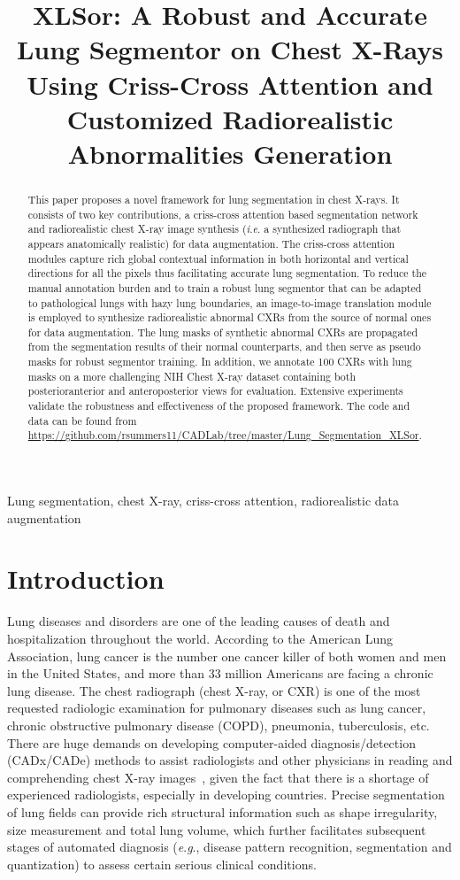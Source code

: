 \documentclass{midl} \usepackage{multirow}
\title[XLSor: A Robust and Accurate Lung Segmentor on Chest X-Rays]{XLSor: A Robust and Accurate Lung Segmentor on Chest X-Rays Using Criss-Cross Attention and Customized Radiorealistic Abnormalities Generation}
\newcommand{\ie}{\textit{i}.\textit{e}. }
\newcommand{\eg}{\textit{e}.\textit{g}., }
\begin{document}
\maketitle

\begin{abstract}
This paper proposes a novel framework for lung segmentation in chest X-rays. It consists of two key contributions, a criss-cross attention based segmentation network and radiorealistic chest X-ray image synthesis (\ie a synthesized radiograph that appears anatomically realistic) for data augmentation.
The criss-cross attention modules capture rich global contextual information in both horizontal and vertical directions for all the pixels thus facilitating accurate lung segmentation. 
To reduce the manual annotation burden and to train a robust lung segmentor that can be adapted to pathological lungs with hazy lung boundaries, an image-to-image translation module is employed to synthesize radiorealistic abnormal CXRs from the source of normal ones for data augmentation. 
The lung masks of synthetic abnormal CXRs are propagated from the segmentation results of their normal counterparts, and then serve as pseudo masks for robust segmentor training. In addition, we annotate 100 CXRs with lung masks on a more challenging NIH Chest X-ray dataset containing both posterioranterior and anteroposterior views for evaluation. Extensive experiments validate the robustness and effectiveness of the proposed framework. The code and data can be found from \url{https://github.com/rsummers11/CADLab/tree/master/Lung_Segmentation_XLSor}.
\end{abstract}
	
\begin{keywords}
Lung segmentation, chest X-ray, criss-cross attention, radiorealistic data augmentation
\end{keywords}

\section{Introduction}
\label{intro}
Lung diseases and disorders are one of the leading causes of death and hospitalization throughout the world. According to the American Lung Association, lung cancer is the number one cancer killer of both women and men in the United States, and more than 33 million Americans are facing a chronic lung disease. The chest radiograph (chest X-ray, or CXR) is one of the most requested radiologic examination for pulmonary diseases such as lung cancer, chronic obstructive pulmonary disease (COPD), pneumonia, tuberculosis, etc. There are huge demands on developing computer-aided diagnosis/detection (CADx/CADe)  methods to assist radiologists and other physicians in reading and comprehending chest X-ray images~\cite{Shin_2016_CVPR, Wang_cvpr17, Wang_cvpr18, Tang_MLMI}, given the fact that there is a shortage of experienced radiologists, especially in developing countries.
Precise segmentation of lung fields can provide rich structural information such as shape irregularity, size measurement and total lung volume, which further facilitates subsequent stages of automated diagnosis (\eg disease pattern recognition, segmentation and quantization) to assess certain serious clinical conditions. 
\end{document}
